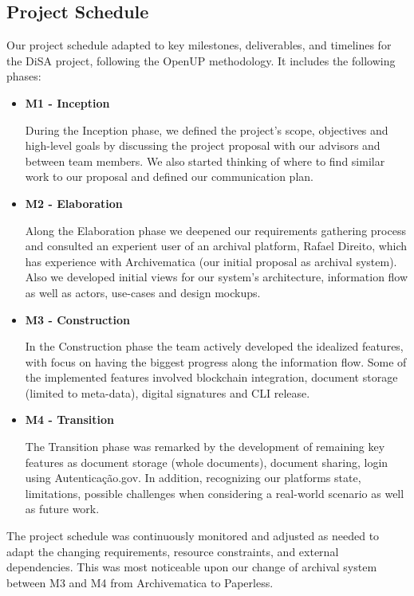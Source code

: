 \documentclass[a4paper,11pt]{article}
\begin{document}
        \subsection{Project Schedule}
            \quad Our project schedule adapted to key milestones, deliverables, and timelines for the DiSA project, following the OpenUP methodology. It includes the following phases:
            \begin{itemize}
                \item \textbf{M1 - Inception} 
                
                During the Inception phase, we defined the project's scope, objectives and high-level goals by discussing the project proposal with our advisors and between team members. We also started thinking of where to find similar work to our proposal and defined our communication plan.

                \item \textbf{M2 - Elaboration}

                Along the Elaboration phase we deepened our requirements gathering process and consulted an experient user of an archival platform, Rafael Direito, which has experience with Archivematica (our initial proposal as archival system). Also we developed initial views for our system's architecture, information flow as well as actors, use-cases and design mockups.

                \item \textbf{M3 - Construction}

                In the Construction phase the team actively developed the idealized features, with focus on having the biggest progress along the information flow. Some of the implemented features involved blockchain integration, document storage (limited to meta-data), digital signatures and CLI release.
                
                \item \textbf{M4 - Transition}

                The Transition phase was remarked by the development of remaining key features as document storage (whole documents), document sharing, login using Autenticação.gov. In addition, recognizing our platforms state, limitations, possible challenges when considering a real-world scenario as well as future work.
                
            \end{itemize}
            \quad The project schedule was continuously monitored and adjusted as needed to adapt the changing requirements, resource constraints, and external dependencies. This was most noticeable upon our change of archival system between M3 and M4 from Archivematica to Paperless.
\end{document}
